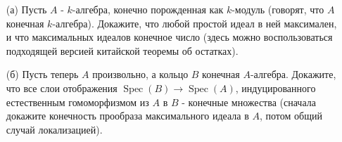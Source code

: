 \begin{prob}
\begin{itemize}
\item[]
\item[(а)] Пусть $A$ - $k$-алгебра, конечно порожденная как $k$-модуль (говорят, что $A$ конечная $k$-алгебра). Докажите, что любой простой идеал в ней максимален, и что максимальных идеалов конечное число (здесь можно воспользоваться подходящей версией китайской теоремы об остатках).
\item[(б)] Пусть теперь $A$ произвольно, а кольцо $B$ конечная $A$-алгебра. Докажите, что все слои отображения $\operatorname{Spec}(B) \rightarrow \operatorname{Spec}(A)$, индуцированного естественным гомоморфизмом из $A$ в $B$ - конечные множества (сначала докажите конечность прообраза максимального идеала в $A$, потом общий случай локализацией).
\end{itemize}
\end{prob}
